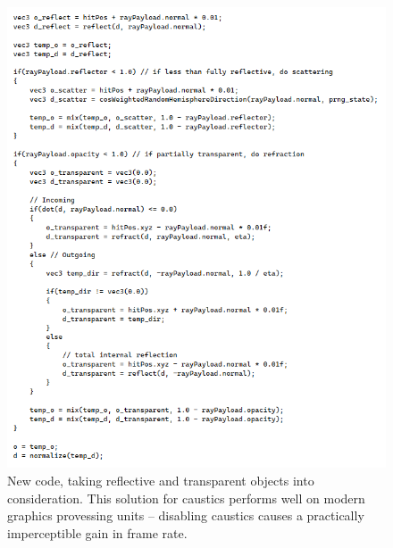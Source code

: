 \documentclass[10pt]{article}
\begin{document}
\begin{figure} 
\centering
  \includegraphics[width = 6 in]{code.png}
  \caption{ New code, taking reflective and transparent objects into consideration.
This solution for caustics performs well on modern graphics provessing units -- disabling caustics causes a practically imperceptible gain in frame rate.
}
\end{figure}
\end{document}
